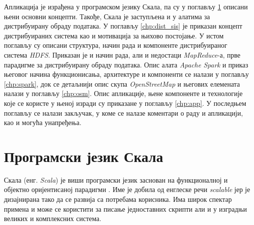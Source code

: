 \documentclass[12pt,oneside]{memoir}
\begin{document}
Апликација је израђена у програмском језику Скала, па су у поглављу \ref{chp:scala} описани њени основни концепти. Такође, Скала је заступљена и у алатима за дистрибуирану обраду података. У поглављу \ref{chp:dist_sis} је приказан концепт дистрибуираних система као и мотивација за њихово постојање. У истом поглављу су описани структура, начин рада и компоненте дистрибуираног система \textit{HDFS}. Приказан је и начин рада, али и недостаци \textit{MapReduce}-а, прве парадигме за дистрибуирану обраду података. Опис алата \textit{Apache Spark} и приказ његовог начина функционисања, архитектуре и компоненти се налази у поглављу \ref{chp:spark}, док се детаљнији опис скупа \textit{OpenStreetMap} и његових елемената налази у поглављу \ref{chp:osm}. Опис апликације, њене компоненте и технологије које се користе у њеној изради су приказане у поглављу \ref{chp:app}. У последњем поглављу се налази закључак, у коме се налазе коментари о раду и апликацији, као и могућа унапређења.

%
%

\chapter{Програмски језик Скала}
\label{chp:scala}

Скала (енг. \textit{Scala}) је виши програмски језик заснован на функционалној и објектно оријентисаној парадигми  \cite{scala_prog}. Име је добила од енглеске речи \textit{scalable} јер је дизајнирана тако да се развија са потребама корисника. Има широк спектар примена и може се користити за писање једноставних скрипти али и у изградњи великих и комплексних система.
\end{document}
